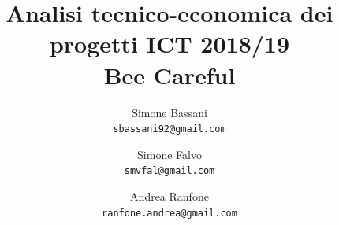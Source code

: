 \documentclass[a4paper,titlepage]{article}
\begin{document}

\title{
  Analisi tecnico-economica dei progetti ICT 2018/19\\[20pt]
  Bee Careful
}
\author{
  Simone Bassani\\
  \texttt{sbassani92@gmail.com}
  \and
  Simone Falvo\\
  \texttt{smvfal@gmail.com}
  \and
  Andrea Ranfone\\
  \texttt{ranfone.andrea@gmail.com}
}

\date{}


\maketitle

%

\tableofcontents
\newpage







\end{document}
